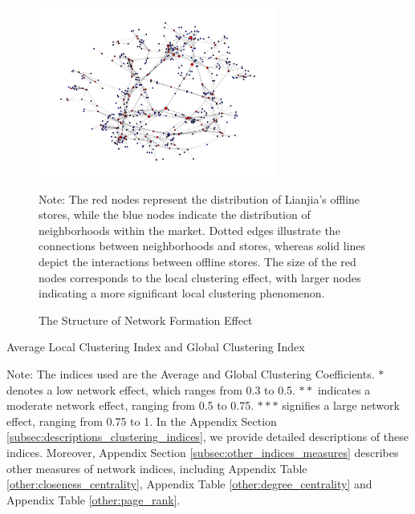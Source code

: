 \documentclass[11pt]{article}
\begin{document}
\begin{figure}
  \centering
  \includegraphics[width=0.7\textwidth]{../figures/network_formation_effect.pdf}
  \caption{The Structure of Network Formation Effect}
  \label{fig:network_formation_effect_graph}

  Note: The red nodes represent the distribution of Lianjia's offline stores, while the blue nodes indicate the distribution of neighborhoods within the market. Dotted edges illustrate the connections between neighborhoods and stores, whereas solid lines depict the interactions between offline stores. The size of the red nodes corresponds to the local clustering effect, with larger nodes indicating a more significant local clustering phenomenon.
\end{figure}

\begin{table}
  \begin{center}
    \begin{scriptsize}
      \caption{Average Local Clustering Index and Global Clustering Index}
      \label{tab:local_global_clustering_indices}
      

      Note: The indices used are the Average and Global Clustering Coefficients. $*$ denotes a low network effect, which ranges from 0.3 to 0.5. $**$ indicates a moderate network effect, ranging from 0.5 to 0.75. $***$ signifies a large network effect, ranging from 0.75 to 1. In the Appendix Section \ref{subsec:descriptions_clustering_indices}, we provide detailed descriptions of these indices. Moreover, Appendix Section \ref{subsec:other_indices_measures} describes other measures of network indices, including Appendix Table \ref{other:closeness_centrality}, Appendix Table \ref{other:degree_centrality} and Appendix Table \ref{other:page_rank}.
    \end{scriptsize}
  \end{center}
\end{table}
\end{document}
